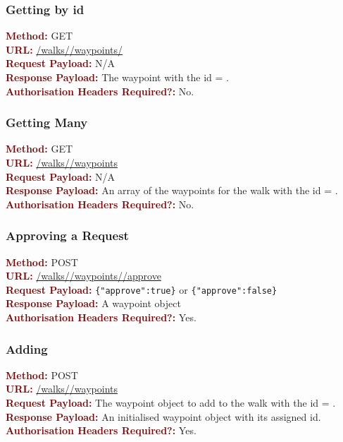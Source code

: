 \documentclass[11pt,a4paper]{report}
\begin{document}
\subsubsection{Getting by id}
\textbf{\textcolor{Maroon}{Method:}} GET\\
\textbf{\textcolor{Maroon}{URL:}} \url{/walks/}\url{/waypoints/}\\
\textbf{\textcolor{Maroon}{Request Payload:}} N/A\\
\textbf{\textcolor{Maroon}{Response Payload:}} The waypoint with the id = .\\
\textbf{\textcolor{Maroon}{Authorisation Headers Required?:}} No.

\subsubsection{Getting Many}
\textbf{\textcolor{Maroon}{Method:}} GET\\
\textbf{\textcolor{Maroon}{URL:}} \url{/walks/}\url{/waypoints}\\
\textbf{\textcolor{Maroon}{Request Payload:}} N/A\\
\textbf{\textcolor{Maroon}{Response Payload:}} An array of the waypoints for the walk with the id = .\\
\textbf{\textcolor{Maroon}{Authorisation Headers Required?:}} No.

\subsubsection{Approving a Request}
\textbf{\textcolor{Maroon}{Method:}} POST\\
\textbf{\textcolor{Maroon}{URL:}} \url{/walks/}\url{/waypoints/}\url{/approve}\\
\textbf{\textcolor{Maroon}{Request Payload:}} \lstinline${"approve":true}$ or \lstinline${"approve":false}$\\
\textbf{\textcolor{Maroon}{Response Payload:}} A waypoint object\\
\textbf{\textcolor{Maroon}{Authorisation Headers Required?:}} Yes.

\subsubsection{Adding}
\textbf{\textcolor{Maroon}{Method:}} POST\\
\textbf{\textcolor{Maroon}{URL:}} \url{/walks/}\url{/waypoints}\\
\textbf{\textcolor{Maroon}{Request Payload:}} The waypoint object to add to the walk with the id = .\\
\textbf{\textcolor{Maroon}{Response Payload:}} An initialised waypoint object with its assigned id.\\
\textbf{\textcolor{Maroon}{Authorisation Headers Required?:}} Yes.
\end{document}

